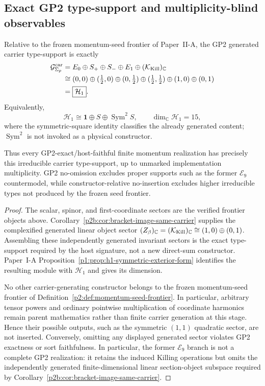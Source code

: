 \documentclass[12pt,a4paper]{article}
\begin{document}
\subsection{Exact GP2 type-support and multiplicity-blind observables}

\begin{theorem}
\label{p2:thm:momentum-host-H1}
Relative to the frozen momentum-seed frontier of Paper~II-A, the GP2 generated
carrier type-support is exactly
\[
 \begin{aligned}
 \mathcal G^{\rm car}_{\Sigma_p}
 &=E_0\oplus S_+\oplus S_-\oplus E_1
   \oplus(\mathcal K_{\rm Kill})_{\mathbb C}\\
 &\cong
 (0,0)\oplus(\tfrac12,0)\oplus(0,\tfrac12)
 \oplus(\tfrac12,\tfrac12)\oplus(1,0)\oplus(0,1)\\
 &=\boxed{\mathcal H_1}.
 \end{aligned}
\]
Equivalently,
\[
 \mathcal H_1\cong\mathbf1\oplus S\oplus\operatorname{Sym}^2S,
 \qquad \dim_{\mathbb C}\mathcal H_1=15,
\]
where the symmetric-square identity classifies the already generated content;
\(\operatorname{Sym}^2\) is not invoked as a physical constructor.

Thus every GP2-exact/host-faithful finite momentum realization has precisely
this irreducible carrier type-support, up to unmarked implementation
multiplicity.  GP2 no-omission excludes proper supports such as the former
\(\mathcal E_9\) countermodel, while constructor-relative no-insertion
excludes higher irreducible types not produced by the frozen seed frontier.
\end{theorem}

\begin{proof}
The scalar, spinor, and first-coordinate sectors are the verified frontier
objects above.  Corollary~\ref{p2b:cor:bracket-image-same-carrier} supplies the
complexified generated linear object sector
\((Z_\beta)_{\mathbb C}=(\mathcal K_{\rm Kill})_{\mathbb C}
\cong(1,0)\oplus(0,1)\).  Assembling
these independently generated invariant sectors is the exact type-support
required by the host signature, not a new direct-sum constructor.
Paper~I-A Proposition~\ref{p1:prop:h1-symmetric-exterior-form}
identifies the resulting module with \(\mathcal H_1\) and gives its dimension.

No other carrier-generating constructor belongs to the frozen momentum-seed
frontier of Definition~\ref{p2:def:momentum-seed-frontier}.  In particular, arbitrary tensor powers and ordinary pointwise
multiplication of coordinate harmonics remain parent mathematics rather than
finite carrier generation at this stage.  Hence their possible outputs, such
as the symmetric \((1,1)\) quadratic sector, are not inserted.  Conversely,
omitting any displayed generated sector violates GP2 exactness or sort
faithfulness.  In particular, the former \(\mathcal E_9\) branch is not a
complete GP2 realization: it retains the induced Killing operations but omits
the independently generated finite-dimensional linear section-object subspace required by
Corollary~\ref{p2b:cor:bracket-image-same-carrier}.
\end{proof}
\end{document}

